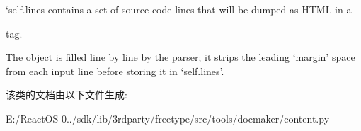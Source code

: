 `self.lines\textquotesingle{} contains a set of source code lines that will be dumped as H\+T\+ML in a 
\begin{DoxyPre} tag.\end{DoxyPre}



\begin{DoxyPre}  The object is filled line by line by the parser; it strips the leading
  `margin' space from each input line before storing it in `self.lines'.
\end{DoxyPre}


该类的文档由以下文件生成\+:\begin{DoxyCompactItemize}
\item 
E\+:/\+React\+O\+S-\/0../sdk/lib/3rdparty/freetype/src/tools/docmaker/content.\+py\end{DoxyCompactItemize}
